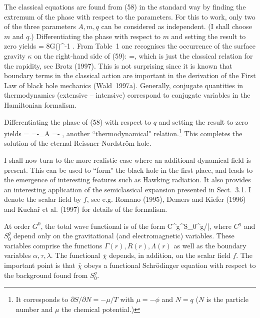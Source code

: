 The classical equations are found from (58) in the standard way by
finding the extremum of the phase with respect to the parameters.
For this to work, only two of the three parameters $A,m,q$
can be considered as independent. (I shall choose $m$ and $q$.)
Differentiating the phase with respect to $m$ and setting the result to zero
yields
\be \alpha= 8\pi G\left(\right)^{-1}
    \tau \enspace . \ee
{}From Table~1 one recognises the occurrence of the surface gravity
$\kappa$ on the right-hand side of (59):
\be \alpha=\kappa\tau \enspace , \ee
which is just the classical relation for the rapidity, see Brotz (1997).
This is not surprising since it is known that boundary terms
in the classical action are important in the derivation of
the First Law of black hole mechanics (Wald~1997a).
Generally, conjugate quantities in thermodynamics (extensive --
intensive) correspond to conjugate variables in the Hamiltonian
formalism.

Differentiating the phase of (58) with respect to $q$
and setting the result to zero
yields
\be \phi=
        =-\vert_A =-
    \enspace , \ee
another ``thermodynamical" relation.\footnote{It corresponds to
$\partial S/\partial N=-\mu/T$ with $\mu=-\phi$ and
$N=q$ ($N$ is the particle number and $\mu$ the chemical potential.)}
This completes the solution of the eternal Reissner-Nordstr\"om
hole. 

I shall now turn to the more realistic case where an additional
dynamical field is present. This can be used to ``form" the black hole
in the first place, and leads to the emergence of 
interesting features such as Hawking radiation. It also provides 
an interesting application of the semiclassical expansion
presented in Sect.~3.1. I denote the scalar field  by $f$, see e.g.
Romano (1995), Demers and Kiefer (1996)
 and Kucha\v{r} et al. (1997) for details of the formalism.

At order $G^0$, the total wave functional is of the form
\be \Psi\approx C^g\E^{\I S_0^g/\hbar}\bar{\chi}\enspace , \ee
where $C^g$ and $S_0^g$ depend only on the gravitational
(and electromagnetic) variables. These variables comprise
the functions $\Gamma(r), R(r), \Lambda(r)$ as well as the
boundary variables $\alpha,\tau,\lambda$. The functional $\bar{\chi}$
depends, in addition, on the scalar field $f$. The important point
is that $\bar{\chi}$ obeys a functional Schr\"odinger equation
with respect to the background found from $S_0^g$.

